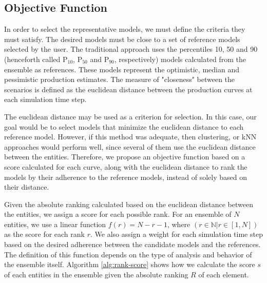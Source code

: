 \documentclass[final,5p,times,twocolumn]{elsarticle}
\begin{document}
\subsection{Objective Function}
\label{sec:obj_func}
In order to select the representative models, we must define the criteria they must satisfy. The desired models must be close to a set of reference models selected by the user. The traditional approach uses the percentiles 10, 50 and 90 (henceforth called P$_{10}$, P$_{50}$ and P$_{90}$, respectively) models calculated from the ensemble as references. These models represent the optimistic, median and pessimistic production estimates. The measure of "closeness" between the scenarios is defined as the euclidean distance between the production curves at each simulation time step.

The euclidean distance may be used as a criterion for selection. In this case, our goal would be to select models that minimize the euclidean distance to each reference model. However, if this method was adequate, then clustering, or kNN approaches would perform well, since several of them use the euclidean distance between the entities. Therefore, we propose an objective function based on a score calculated for each curve, along with the euclidean distance to rank the models by their adherence to the reference models, instead of solely based on their distance.

Given the absolute ranking calculated based on the euclidean distance between the entities, we assign a score for each possible rank. For an ensemble of $N$ entities, we use a linear function $f(r) = N - r - 1$, where $\left(r \in \mathbb{N} | r \in [1, N] \right)$ as the score for each rank $r$. We also assign a weight for each simulation time step based on the desired adherence between the candidate models and the references. The definition of this function depends on the type of analysis and behavior of the ensemble itself. Algorithm \ref{alg:rank-score} shows how we calculate the score $s$ of each entities in the ensemble given the absolute ranking $R$ of each element.

%    
%    
\end{document}
